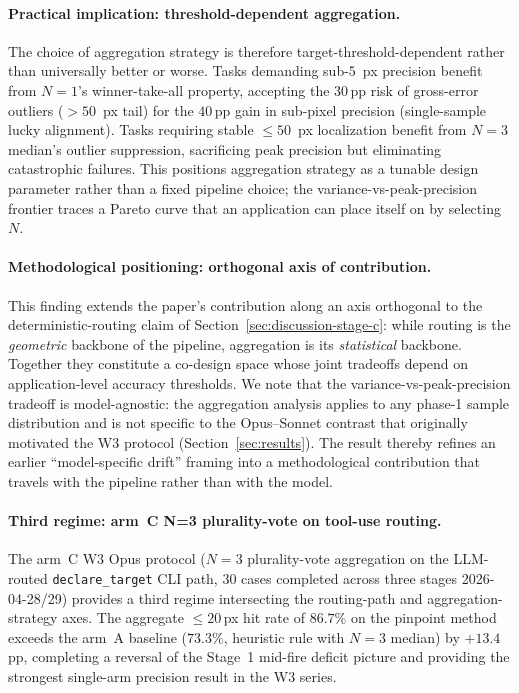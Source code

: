 \paragraph{Practical implication: threshold-dependent aggregation.}
The choice of aggregation strategy is therefore
target-threshold-dependent rather than universally better or
worse.  Tasks demanding sub-$5$~px precision benefit from
$N=1$'s winner-take-all property, accepting the $30$\,pp
risk of gross-error outliers ($>\!50$~px tail) for the
$40$\,pp gain in sub-pixel precision (single-sample lucky
alignment).  Tasks requiring stable $\leq\!50$~px
localization benefit from $N=3$ median's outlier
suppression, sacrificing peak precision but eliminating
catastrophic failures.  This positions aggregation strategy
as a tunable design parameter rather than a fixed pipeline
choice; the variance-vs-peak-precision frontier traces a
Pareto curve that an application can place itself on by
selecting~$N$.

\paragraph{Methodological positioning: orthogonal axis of contribution.}
This finding extends the paper's contribution along an axis
orthogonal to the deterministic-routing claim of
Section~\ref{sec:discussion-stage-c}: while routing is the
\emph{geometric} backbone of the pipeline, aggregation is
its \emph{statistical} backbone.  Together they constitute
a co-design space whose joint tradeoffs depend on
application-level accuracy thresholds.  We note that the
variance-vs-peak-precision tradeoff is model-agnostic: the
aggregation analysis applies to any phase-1 sample
distribution and is not specific to the Opus--Sonnet
contrast that originally motivated the W3 protocol
(Section~\ref{sec:results}).  The result thereby refines an
earlier ``model-specific drift'' framing into a
methodological contribution that travels with the pipeline
rather than with the model.

\paragraph{Third regime: arm~C N=3 plurality-vote on tool-use routing.}
The arm~C W3 Opus protocol ($N\!=\!3$ plurality-vote
aggregation on the LLM-routed \texttt{declare\_target} CLI
path, 30 cases completed across three stages 2026-04-28/29)
provides a third regime intersecting the routing-path and
aggregation-strategy axes.  The aggregate $\leq\!20$\,px hit
rate of $\mathbf{86.7\%}$ on the pinpoint method exceeds the
arm~A baseline ($73.3\%$, heuristic rule with $N\!=\!3$
median) by $+13.4$\,pp, completing a reversal of the
Stage~1 mid-fire deficit picture and providing the
strongest single-arm precision result in the W3 series.

